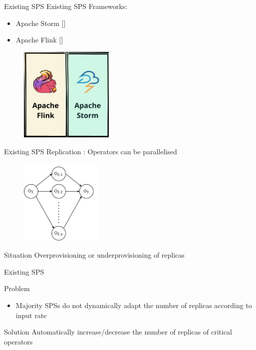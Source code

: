 \begin{frame}{Existing SPS}
	Existing SPS Frameworks: 
	\begin{itemize}
		\item Apache Storm [\cite{toshniwal2014storm}]
   		\item Apache Flink [\cite{CarboneKEMHT15}]
	\end{itemize}
    
    \begin{figure}
		\includegraphics[width=0.4\textwidth]{images/problems/SPS-Framework.png}
	\end{figure}
\end{frame}

\begin{frame}{Existing SPS}
	Replication : Operators can be parallelised
   
    \begin{figure}
		\includegraphics[width=0.35\textwidth]{images/problems/SPS-Operator-Parallelism-Logical.pdf}
	\end{figure}
	
	\pause
	
	\begin{alertblock}{Situation}
		Overprovisioning or underprovisioning of replicas
	\end{alertblock}
\end{frame}



\begin{frame}{Existing SPS}
	\begin{alertblock}{Problem}
		\begin{itemize}
		    \item Majority SPSs do not dynamically adapt the number of replicas according to input rate
		\end{itemize}
	\end{alertblock}
	\pause
	\begin{block}{Solution}
		Automatically increase/decrease the number of replicas of critical operators
	\end{block}
\end{frame}
